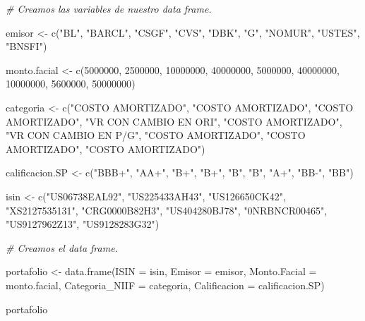 \documentclass[
  12pt,
]{book}
\newenvironment{Shaded}{\begin{snugshade}}{\end{snugshade}}
\newcommand{\AttributeTok}[1]{\textcolor[rgb]{0.77,0.63,0.00}{#1}}
\newcommand{\CommentTok}[1]{\textcolor[rgb]{0.56,0.35,0.01}{\textit{#1}}}
\newcommand{\DecValTok}[1]{\textcolor[rgb]{0.00,0.00,0.81}{#1}}
\newcommand{\FunctionTok}[1]{\textcolor[rgb]{0.00,0.00,0.00}{#1}}
\newcommand{\NormalTok}[1]{#1}
\newcommand{\OtherTok}[1]{\textcolor[rgb]{0.56,0.35,0.01}{#1}}
\newcommand{\StringTok}[1]{\textcolor[rgb]{0.31,0.60,0.02}{#1}}
\begin{document}
\begin{Shaded}
\begin{Highlighting}[]
\CommentTok{\# Creamos las variables de nuestro data frame.}

\NormalTok{emisor }\OtherTok{\textless{}{-}} \FunctionTok{c}\NormalTok{(}\StringTok{"BL"}\NormalTok{, }\StringTok{"BARCL"}\NormalTok{, }\StringTok{"CSGF"}\NormalTok{, }\StringTok{"CVS"}\NormalTok{, }\StringTok{"DBK"}\NormalTok{, }\StringTok{"G"}\NormalTok{, }\StringTok{"NOMUR"}\NormalTok{, }\StringTok{"USTES"}\NormalTok{, }\StringTok{"BNSFI"}\NormalTok{)}

\NormalTok{monto.facial }\OtherTok{\textless{}{-}} \FunctionTok{c}\NormalTok{(}\DecValTok{5000000}\NormalTok{, }\DecValTok{2500000}\NormalTok{, }\DecValTok{10000000}\NormalTok{, }\DecValTok{40000000}\NormalTok{, }\DecValTok{5000000}\NormalTok{, }\DecValTok{40000000}\NormalTok{, }\DecValTok{10000000}\NormalTok{, }\DecValTok{5600000}\NormalTok{, }\DecValTok{50000000}\NormalTok{)}

\NormalTok{categoria }\OtherTok{\textless{}{-}} \FunctionTok{c}\NormalTok{(}\StringTok{"COSTO AMORTIZADO"}\NormalTok{, }\StringTok{"COSTO AMORTIZADO"}\NormalTok{, }\StringTok{"COSTO AMORTIZADO"}\NormalTok{, }\StringTok{"VR CON CAMBIO EN ORI"}\NormalTok{, }\StringTok{"COSTO AMORTIZADO"}\NormalTok{, }\StringTok{"VR CON CAMBIO EN P/G"}\NormalTok{, }\StringTok{"COSTO AMORTIZADO"}\NormalTok{, }\StringTok{"COSTO AMORTIZADO"}\NormalTok{, }\StringTok{"COSTO AMORTIZADO"}\NormalTok{)}

\NormalTok{calificacion.SP }\OtherTok{\textless{}{-}} \FunctionTok{c}\NormalTok{(}\StringTok{"BBB+"}\NormalTok{, }\StringTok{"AA+"}\NormalTok{, }\StringTok{"B+"}\NormalTok{, }\StringTok{"B+"}\NormalTok{, }\StringTok{"B"}\NormalTok{, }\StringTok{"B"}\NormalTok{, }\StringTok{"A+"}\NormalTok{, }\StringTok{"BB{-}"}\NormalTok{, }\StringTok{"BB"}\NormalTok{)}

\NormalTok{isin }\OtherTok{\textless{}{-}} \FunctionTok{c}\NormalTok{(}\StringTok{"US06738EAL92"}\NormalTok{, }\StringTok{"US225433AH43"}\NormalTok{, }\StringTok{"US126650CK42"}\NormalTok{, }\StringTok{"XS2127535131"}\NormalTok{, }\StringTok{"CRG0000B82H3"}\NormalTok{, }\StringTok{"US404280BJ78"}\NormalTok{, }\StringTok{"0NRBNCR00465"}\NormalTok{, }\StringTok{"US9127962Z13"}\NormalTok{, }\StringTok{"US9128283G32"}\NormalTok{)}


\CommentTok{\# Creamos el data frame.}

\NormalTok{portafolio }\OtherTok{\textless{}{-}} \FunctionTok{data.frame}\NormalTok{(}\AttributeTok{ISIN =}\NormalTok{ isin, }\AttributeTok{Emisor =}\NormalTok{ emisor, }\AttributeTok{Monto.Facial =}\NormalTok{ monto.facial, }\AttributeTok{Categoria\_NIIF =}\NormalTok{ categoria, }\AttributeTok{Calificacion =}\NormalTok{ calificacion.SP)}


\NormalTok{portafolio}
\end{Highlighting}
\end{Shaded}
\end{document}
